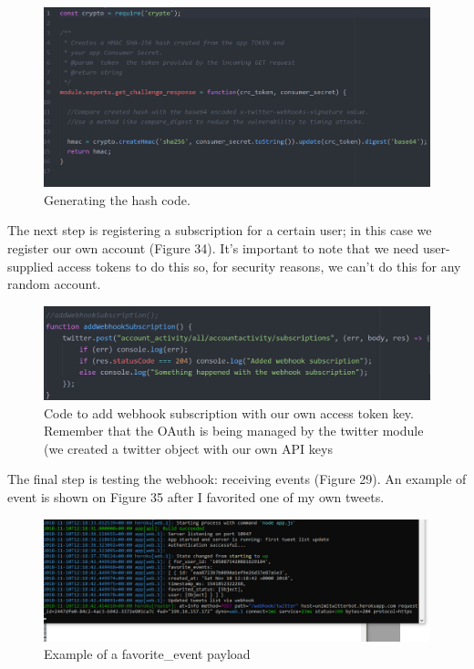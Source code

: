 \documentclass[12pt]{article} %
\begin{document}
\begin{enumerate}
		\begin{figure}[H] %
		\includegraphics[width=1\linewidth]{images/hashCreation}
		\caption{Generating the hash code.}
		\label{hashCreation}
		\end{figure}

		The next step is registering a subscription for a certain user; in this case we register our own account (Figure 34). It's important to note that 
		we need user-supplied access tokens to do this so, for security reasons, we can't do this for any random account. 

		\begin{figure}[H] %
		\includegraphics[width=1\linewidth]{images/addWebhookSubscription}
		\caption{Code to add webhook subscription with our own access token key. Remember that the OAuth is being managed by the twitter module (we created a twitter object 				with our own API keys}
		\label{addWebhookSubscription}
		\end{figure}

		The final step is testing the webhook: receiving events (Figure 29). An example of event is shown on Figure 35 after I favorited one of my own tweets.

		\begin{figure}[H] %
		\includegraphics[width=1\linewidth]{images/favoriteEventExample}
		\caption{Example of a favorite\_event payload}
		\label{favoriteEventExample}
		\end{figure}


\end{enumerate}
\end{document}
